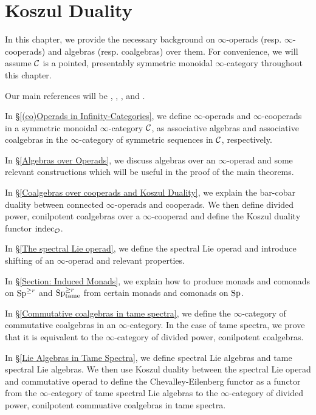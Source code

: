 \chapter{Koszul Duality}

In this chapter, we provide the necessary background on $\infty$-operads (resp. $\infty$-cooperads) and algebras (resp. coalgebras) over them. For convenience, we will assume ${\mathcal{C}}$ is a pointed, presentably symmetric monoidal $\infty$-category throughout this chapter.

Our main references will be \cite{BrantnerPhD},  \cite{Heuts_Koszul}, \cite{Francis-Gaitsgory}, \cite{Hadrianphdthesis} and \cite{HA}.
 
In \S \ref{(co)Operads in Infinity-Categories}, we define $\infty$-operads and $\infty$-cooperads in a symmetric monoidal $\infty$-category ${\mathcal{C}}$, as associative algebras and associative coalgebras in the $\infty$-category of symmetric sequences in ${\mathcal{C}}$, respectively.

In \S \ref{Algebras over Operads}, we discuss algebras over an $\infty$-operad and some relevant constructions which will be useful in the proof of the main theorems. 

In \S \ref{Coalgebras over cooperads and Koszul Duality}, we explain the bar-cobar duality between connected $\infty$-operads and cooperads. We then define divided power, conilpotent coalgebras over a $\infty$-cooperad and define the Koszul duality functor $\operatorname{indec}_{{\mathcal{O}}}$.

In \S \ref{The spectral Lie operad}, we define the spectral Lie operad and introduce shifting of an $\infty$-operad and relevant properties.

In \S \ref{Section: Induced Monads}, we explain how to produce monads and comonads on $\operatorname{Sp}^{\geq r}$ and $\operatorname{Sp}^{\geq r}_{\operatorname{\operatorname{tame}}}$ from certain monads and comonads on $\operatorname{Sp}$.

In \S \ref{Commutative coalgebras in tame spectra}, we define the $\infty$-category of commutative coalgebras in an $\infty$-category. In the case of tame spectra, we prove that it is equivalent to the $\infty$-category of divided power, conilpotent coalgebras.

In \S \ref{Lie Algebras in Tame Spectra}, we define spectral Lie algebras and tame spectral Lie algebras. We then use Koszul duality between the spectral Lie operad and commutative operad to define the Chevalley-Eilenberg functor as a functor from the $\infty$-category of tame spectral Lie algebras to the $\infty$-category of divided power, conilpotent commuative coalgebras in tame spectra.




